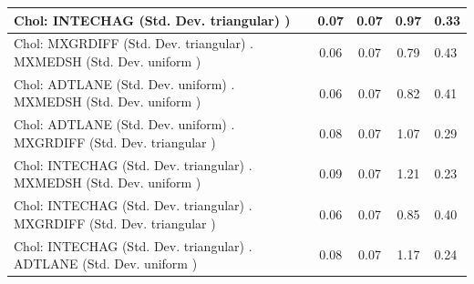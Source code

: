 \begin{table}
\begin{center}
\begin{tabular}{|l|l|c|c|c|l|}
			\hline
			 Chol: INTECHAG (Std. Dev. triangular) ) &  & 0.07 & 0.07 & 0.97 & 0.33 \\
			\hline
			 Chol: MXGRDIFF (Std. Dev. triangular) . MXMEDSH (Std. Dev.   uniform ) &  & 0.06 & 0.07 & 0.79 & 0.43 \\
			\hline
			 Chol: ADTLANE (Std. Dev. uniform) . MXMEDSH (Std. Dev.   uniform ) &  & 0.06 & 0.07 & 0.82 & 0.41 \\
			\hline
			 Chol: ADTLANE (Std. Dev. uniform) . MXGRDIFF (Std. Dev.   triangular ) &  & 0.08 & 0.07 & 1.07 & 0.29 \\
			\hline
			 Chol: INTECHAG (Std. Dev. triangular) . MXMEDSH (Std. Dev.   uniform ) &  & 0.09 & 0.07 & 1.21 & 0.23 \\
			\hline
			 Chol: INTECHAG (Std. Dev. triangular) . MXGRDIFF (Std. Dev.   triangular ) &  & 0.06 & 0.07 & 0.85 & 0.40 \\
			\hline
			 Chol: INTECHAG (Std. Dev. triangular) . ADTLANE (Std. Dev.   uniform ) &  & 0.08 & 0.07 & 1.17 & 0.24 \\
			\hline
		\end{tabular}
	\end{center}
\end{table}